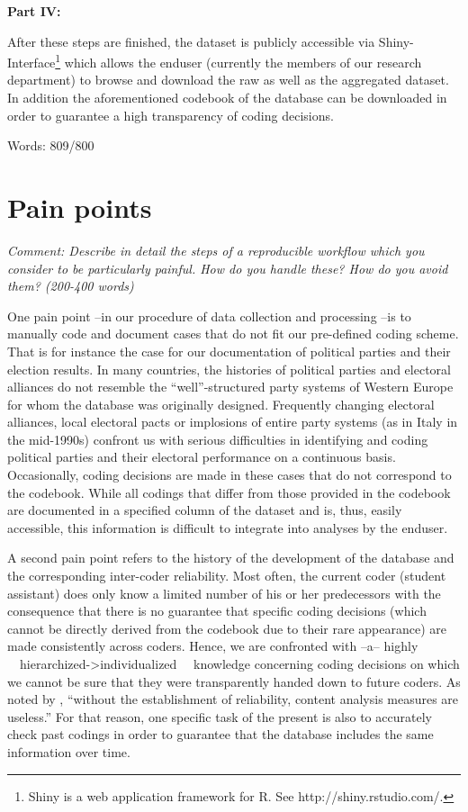 \documentclass[
  11pt
]{article}
\begin{document}
\textbf{Part IV:}

After these steps are finished, the dataset is publicly accessible via Shiny-Interface\footnote{Shiny is a web application framework for R. See http://shiny.rstudio.com/.} which allows the enduser (currently the members of our research department) to browse and download the raw as well as the aggregated dataset. In addition the aforementioned codebook of the database can be downloaded in order to guarantee a high transparency of coding decisions.

\vspace*{1cm}

\noindent
Words: 809/800

\section{Pain points}

\textit{Comment: Describe in detail the steps of a reproducible workflow which you consider to be particularly painful. How do you handle these? How do you avoid them? (200-400 words)}

\vspace*{1cm}

\noindent
One pain point {--in our procedure of data collection and processing --}is to manually code and document cases that do not fit our pre-defined coding scheme. That is for instance the case for our documentation of political parties and their election results. In many countries, the histories of political parties and electoral alliances do not resemble the ``well''-structured party systems of Western Europe for whom the database was originally designed. Frequently changing electoral alliances, local electoral pacts or implosions of entire party systems (as in Italy in the mid-1990s) confront us with serious difficulties in identifying and coding political parties and their electoral performance on a continuous basis. Occasionally, coding decisions are made in these cases that do not correspond to the codebook. While all codings that differ from those provided in the codebook are documented in a specified column of the dataset and is, thus, easily accessible, this information is difficult to integrate into analyses by the enduser.

A second pain point refers to the history of the development of the database and the corresponding inter-coder reliability. Most often, the current coder (student assistant) does only know a limited number of his or her predecessors with the consequence that there is no guarantee that specific coding decisions (which cannot be directly derived from the codebook due to their rare appearance) are made consistently across coders. Hence, we are confronted with {--a--} highly {~~hierarchized->individualized~~} knowledge concerning coding decisions on which we cannot be sure that they were transparently handed down to future coders. As noted by \citet[141]{krippendorf_content_2000}, ``without the establishment of reliability, content analysis measures are useless.'' For that reason, one specific task of the present is also to accurately check past codings in order to guarantee that the database includes the same information over time.
\end{document}
